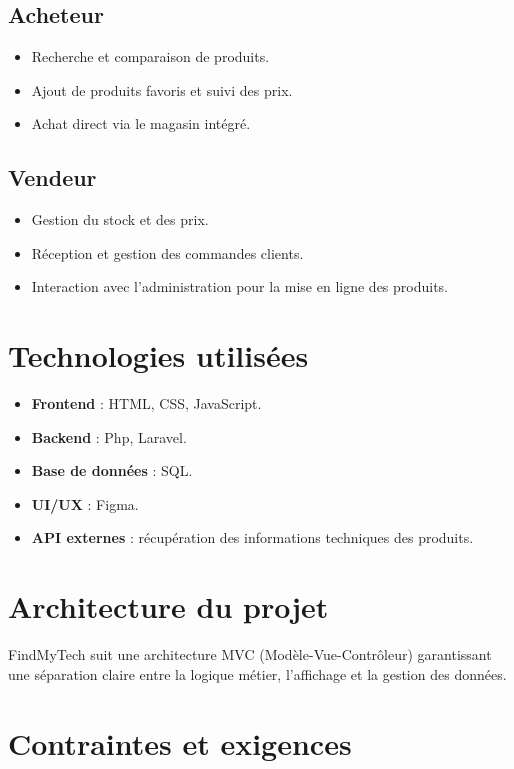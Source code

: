 \documentclass[a4paper,12pt]{article}
\begin{document}
\subsection{Acheteur}
\begin{itemize}
    \item Recherche et comparaison de produits.
    \item Ajout de produits favoris et suivi des prix.
    \item Achat direct via le magasin intégré.
\end{itemize}

\subsection{Vendeur}
\begin{itemize}
    \item Gestion du stock et des prix.
    \item Réception et gestion des commandes clients.
    \item Interaction avec l’administration pour la mise en ligne des produits.
\end{itemize}

\section{Technologies utilisées}
\begin{itemize}
    \item \textbf{Frontend} : HTML, CSS, JavaScript.
    \item \textbf{Backend} : Php, Laravel.
    \item \textbf{Base de données} : SQL.
    \item \textbf{UI/UX} : Figma.
    \item \textbf{API externes} : récupération des informations techniques des produits.
\end{itemize}

\section{Architecture du projet}
FindMyTech suit une architecture MVC (Modèle-Vue-Contrôleur) garantissant une séparation claire entre la logique métier, l'affichage et la gestion des données.

\section{Contraintes et exigences}
\end{document}
